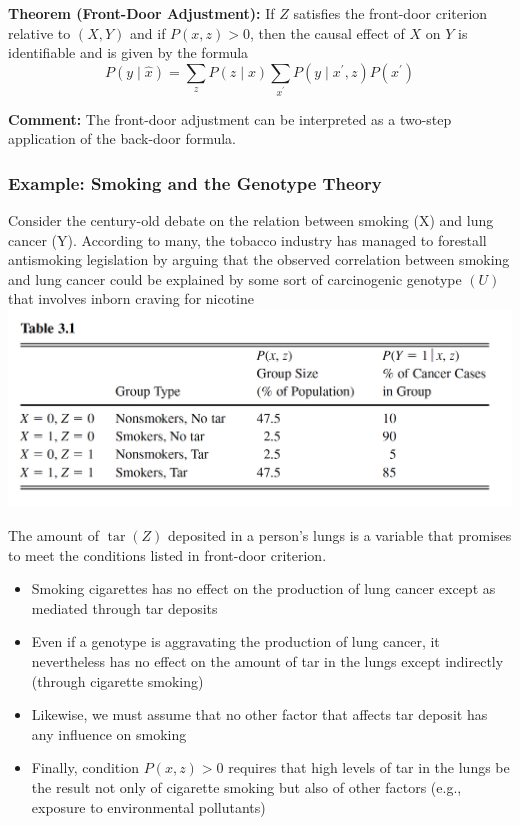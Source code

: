 \documentclass{beamer}
\begin{document}
\begin{frame}
\vspace{0.3cm}
\textbf{Theorem (Front-Door Adjustment):} If $Z$ satisfies the front-door criterion relative to $(X, Y)$ and if $P(x, z)>0$, then the causal effect of $X$ on $Y$ is identifiable and is given by the formula
$$
P(y \mid \hat{x})=\sum_z P(z \mid x) \sum_{x^{\prime}} P\left(y \mid x^{\prime}, z\right) P\left(x^{\prime}\right)
$$

\textbf{Comment:} The front-door adjustment can be interpreted as a two-step application of the back-door formula.
\end{frame}

\begin{frame}
\frametitle{Example: Smoking and the Genotype Theory}
Consider the century-old debate on the relation between smoking (X) and lung cancer (Y). According to many, the tobacco industry has managed to forestall antismoking legislation by arguing that the observed correlation between smoking and lung cancer could be explained by some sort of carcinogenic genotype $(U)$ that involves inborn craving for nicotine
\includegraphics[scale=0.37]{img/fig_6}
\end{frame}

\begin{frame}
The amount of $\operatorname{tar}(Z)$ deposited in a person's lungs is a variable that promises to meet the conditions listed in front-door criterion.
\begin{itemize}
\item Smoking cigarettes has no effect on the production of lung cancer except as mediated through tar deposits
\item Even if a genotype is aggravating the production of lung cancer, it nevertheless has no effect on the amount of tar in the lungs except indirectly (through cigarette smoking)
\item Likewise, we must assume that no other factor that affects tar deposit has any influence on smoking
\item Finally, condition $P(x, z)>0$ requires that high levels of tar in the lungs be the result not only of cigarette smoking but also of other factors (e.g., exposure to environmental pollutants)
\end{itemize}
\end{frame}
\end{document}

